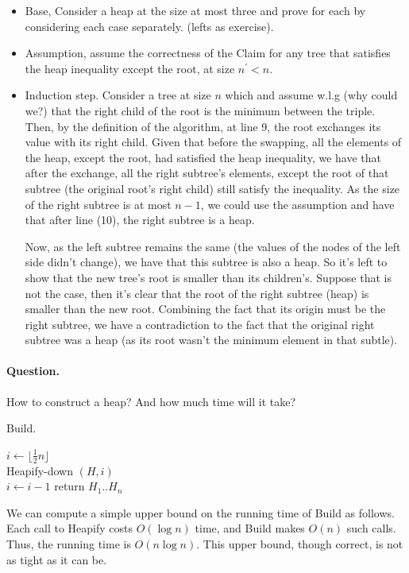 \begin{itemize} 
  \item Base, Consider a heap at the size at most three and prove for each by considering each case separately. (lefts as exercise).  
  \item Assumption, assume the correctness of the Claim for any tree that satisfies the heap inequality except the root, at size $n^{\prime} < n$. 
  \item Induction step. Consider a tree at size $n$ which and assume w.l.g (why could we?) that the right child of the root is the minimum between the triple. Then, by the definition of the algorithm, at line 9, the root exchanges its value with its right child. Given that before the swapping, all the elements of the heap, except the root, had satisfied the heap inequality, we have that after the exchange, all the right subtree's elements, except the root of that subtree (the original root's right child) still satisfy the inequality. As the size of the right subtree is at most $n-1$, we could use the assumption and have that after line (10), the right subtree is a heap.  
 
    Now, as the left subtree remains the same (the values of the nodes of the left side didn't change), we have that this subtree is also a heap. So it's left to show that the new tree's root is smaller than its children's. Suppose that is not the case, then it's clear that the root of the right subtree (heap) is smaller than the new root. Combining the fact that its origin must be the right subtree, we have a contradiction to the fact that the original right subtree was a heap (as its root wasn't the minimum element in that subtle).  
 
\end{itemize} 
\paragraph{Question.} How to construct a heap? And how much time will it take?   
\begin{algbox}{Build.}
\begin{algorithm}[H]
  $ i \leftarrow \lfloor \frac{1}{2}n  \rfloor $ \\
  { 
    Heapify-down $\left( H, i \right)$ \\ 
    $ i \leftarrow i - 1 $  
  }
return $H_{1} .. H_{n}$
\end{algorithm}
\end{algbox}
We can compute a simple upper bound on the running time of Build as follows. Each call to Heapify costs $O(\log n)$ time, and Build makes $O(n)$ such calls. Thus, the running time is $O(n \log n)$. This upper bound, though correct, is not as tight as it can be.

